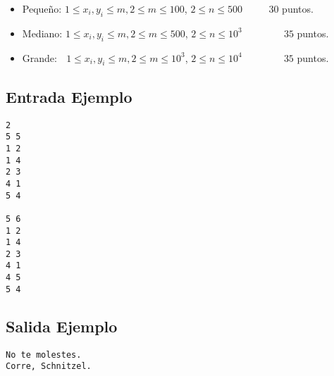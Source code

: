 \begin{itemize}
    \item Pequeño: $ 1 \leq x_i,y_i\leq m, 2\leq m \leq 100$, $2 \leq n \leq 500 $ $\quad \quad $ $30$ puntos.
    \item Mediano: $ 1 \leq x_i,y_i\leq m, 2\leq m \leq 500$, $2 \leq n \leq 10^3 $ $\quad \quad \quad \;\;$ $35$ puntos.
    \item Grande: $\,\;\, 1 \leq x_i,y_i\leq m, 2\leq m \leq 10^3$, $2 \leq n \leq 10^4$ $\quad \quad \quad \;\;$ $35$ puntos.
\end{itemize}

\begin{multicols}{2}
\subsection*{Entrada Ejemplo}
\begin{verbatim}
2
5 5
1 2
1 4
2 3
4 1
5 4

5 6
1 2
1 4
2 3
4 1
4 5
5 4
\end{verbatim}
\columnbreak


\subsection*{Salida Ejemplo}
\begin{verbatim}
No te molestes.
Corre, Schnitzel.
\end{verbatim}
\end{multicols}

